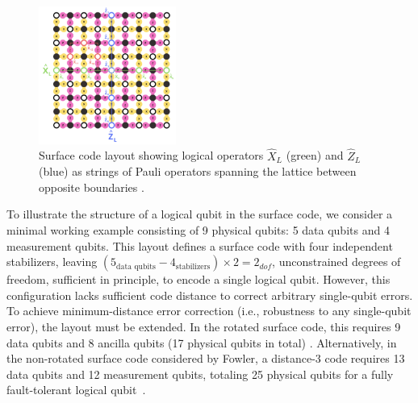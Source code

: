 \documentclass[9pt,a4paper,twocolumn,twoside]{tau-class/tau}
\begin{document}
\begin{figure}[htbp]
    \centering
    \includegraphics[width=0.4\textwidth]{figures/Logical Qubit.png}
    \caption{Surface code layout showing logical operators $\hat{X}_L$ (green) and $\hat{Z}_L$ (blue) as strings of Pauli operators spanning the lattice between opposite boundaries \cite{fowler2012surface}.}
    \label{fig:Logical Qubit}
\end{figure}

To illustrate the structure of a logical qubit in the surface code, we consider a minimal working example consisting of 9 physical qubits: 5 data qubits and 4 measurement qubits. This layout defines a surface code with four independent stabilizers, leaving $(5_{\text{data qubits}} - 4_{\text{stabilizers}}) \times 2 = 2_{dof}$, unconstrained degrees of freedom, sufficient in principle, to encode a single logical qubit. However, this configuration lacks sufficient code distance to correct arbitrary single-qubit errors. To achieve minimum-distance error correction (i.e., robustness to any single-qubit error), the layout must be extended. In the rotated surface code, this requires 9 data qubits and 8 ancilla qubits (17 physical qubits in total) \cite{fowler2014scalable}. Alternatively, in the non-rotated surface code considered by Fowler, a distance-3 code requires 13 data qubits and 12 measurement qubits, totaling 25 physical qubits for a fully fault-tolerant logical qubit~\cite{fowler2012surface}.
\end{document}
